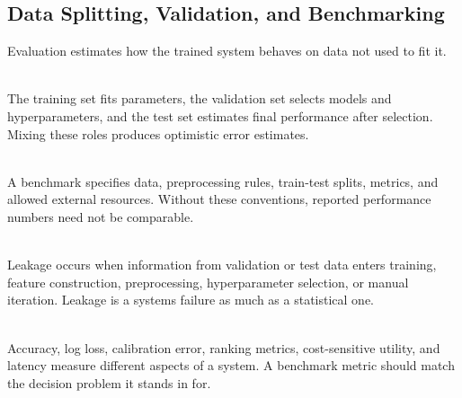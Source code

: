 \subsection{Data Splitting, Validation, and Benchmarking}

Evaluation estimates how the trained system behaves on data not used to fit it.

\begin{definition} \label{def:sl-train-validation-test} \\
The training set fits parameters, the validation set selects models and hyperparameters, and the test set estimates final performance after selection.  Mixing these roles produces optimistic error estimates.
\end{definition}

\begin{definition} \label{def:sl-benchmark} \\
A benchmark specifies data, preprocessing rules, train-test splits, metrics, and allowed external resources.  Without these conventions, reported performance numbers need not be comparable.
\end{definition}

\begin{remark} \label{rem:sl-data-leakage} \\
Leakage occurs when information from validation or test data enters training, feature construction, preprocessing, hyperparameter selection, or manual iteration.  Leakage is a systems failure as much as a statistical one.
\end{remark}

\begin{remark} \label{rem:sl-metric-choice} \\
Accuracy, log loss, calibration error, ranking metrics, cost-sensitive utility, and latency measure different aspects of a system.  A benchmark metric should match the decision problem it stands in for.
\end{remark}

